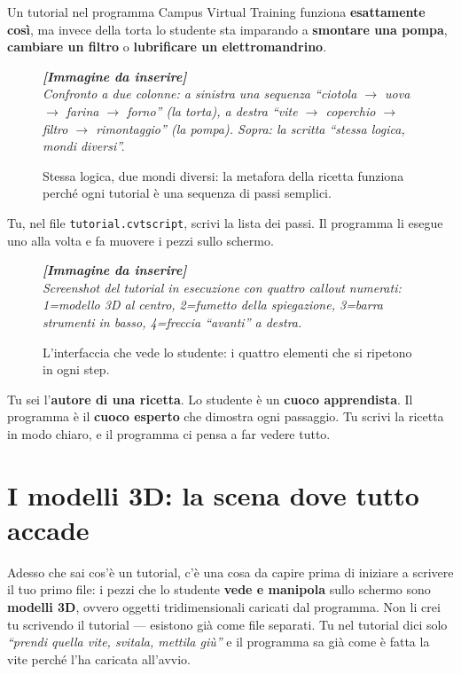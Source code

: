 ﻿\documentclass[a4paper,12pt,oneside]{book}
\newcommand{\file}[1]{\texttt{#1}}
\newcommand{\imgph}[2]{%
  \begin{tcolorbox}[colback=cvtlightblue!30,colframe=cvtblue!40,%
    width=#1,halign=center,valign=center,height=5cm,boxrule=0.5pt,arc=3pt]%
    \textcolor{cvtgray}{\itshape\footnotesize\textbf{[Immagine da inserire]}\\[3pt]#2}%
  \end{tcolorbox}}
\begin{document}
Un tutorial nel programma Campus Virtual Training funziona \textbf{esattamente così},
ma invece della torta lo studente sta imparando a \textbf{smontare una pompa},
\textbf{cambiare un filtro} o \textbf{lubrificare un elettromandrino}.

\begin{figure}[H]
  \centering
  \imgph{13cm}{Confronto a due colonne: a sinistra una sequenza ``ciotola $\rightarrow$ uova $\rightarrow$ farina $\rightarrow$ forno'' (la torta), a destra ``vite $\rightarrow$ coperchio $\rightarrow$ filtro $\rightarrow$ rimontaggio'' (la pompa). Sopra: la scritta ``stessa logica, mondi diversi''.}
  \caption{Stessa logica, due mondi diversi: la metafora della ricetta funziona perché ogni tutorial è una sequenza di passi semplici.}
  \label{fig:torta-vs-pompa}
\end{figure}

Tu, nel file \file{tutorial.cvtscript}, scrivi la lista dei passi. Il programma
li esegue uno alla volta e fa muovere i pezzi sullo schermo.

\begin{figure}[H]
  \centering
  \imgph{12cm}{Screenshot del tutorial in esecuzione con quattro callout numerati: 1=modello 3D al centro, 2=fumetto della spiegazione, 3=barra strumenti in basso, 4=freccia ``avanti'' a destra.}
  \caption{L'interfaccia che vede lo studente: i quattro elementi che si ripetono in ogni step.}
  \label{fig:interfaccia-annotata}
\end{figure}

\begin{notablu}
Tu sei l'\textbf{autore di una ricetta}. Lo studente è un \textbf{cuoco apprendista}.
Il programma è il \textbf{cuoco esperto} che dimostra ogni passaggio. Tu scrivi la
ricetta in modo chiaro, e il programma ci pensa a far vedere tutto.
\end{notablu}

\chapter{I modelli 3D: la scena dove tutto accade}
\label{ch:modelli3d}

Adesso che sai cos'è un tutorial, c'è una cosa da capire prima di
iniziare a scrivere il tuo primo file: i pezzi che lo studente
\textbf{vede e manipola} sullo schermo sono \textbf{modelli 3D}, ovvero
oggetti tridimensionali caricati dal programma. Non li crei tu scrivendo
il tutorial --- esistono già come file separati. Tu nel tutorial dici
solo \emph{``prendi quella vite, svitala, mettila giù''} e il programma
sa già come è fatta la vite perché l'ha caricata all'avvio.
\end{document}

